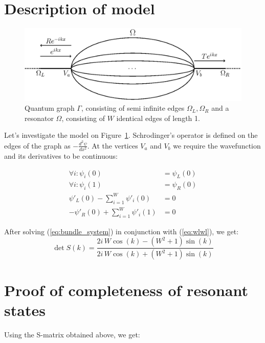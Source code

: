 \documentclass{gCOV2e}
\theoremstyle{plain}%
\theoremstyle{definition}
\theoremstyle{remark}
\begin{document}
\section{Description of model}

\begin{figure}[htbp]
\begin{center}
\includegraphics[trim=0 670 155 0,clip,width=\textwidth]{resonator_bundle.eps}
\caption{Quantum graph $\Gamma$, consisting of semi infinite edges $\Omega_L, \Omega_R$ 
and a resonator $\Omega$, consisting of $W$ identical edges of length 1.}
\label{fig:res_bundle}
\end{center}
\end{figure}


Let's investigate the model on Figure~\ref{fig:res_bundle}. Schrodinger's operator is defined on the edges of the graph as  $-\frac{d^2 \psi}{dx^2}$. At the vertices $V_a$ and $V_b$ we require the wavefunction and its derivatives to be continuous:

\begin{equation}\label{eq:bundle_system}
\begin{aligned}
   \forall i: \psi_i(0) &= \psi_L(0)
\\ \forall i: \psi_i(1) &= \psi_R(0)
\\ \psi'_L(0) - \sum\limits_{i = 1}^W \psi'_i(0) &= 0
\\ -\psi'_R(0) + \sum\limits_{i = 1}^W \psi'_i(1) &= 0
\end{aligned}
\end{equation}

After solving (\ref{eq:bundle_system}) in conjunction with (\ref{eq:wlwl}), we get:
\begin{equation*}
\det S(k) = \frac{2 i \, W \cos\left(k\right) - {\left(W^{2} + 1\right)} \sin\left(k\right)}{2 i \, W \cos\left(k\right) + {\left(W^{2} + 1\right)} \sin\left(k\right)}
\end{equation*}

\section{Proof of completeness of resonant states}
Using the S-matrix obtained above, we get:
\end{document}
